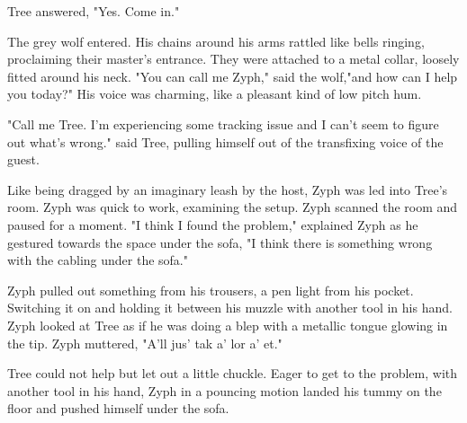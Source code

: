 Tree answered, "Yes. Come in."

The grey wolf entered. His chains around his arms rattled like bells ringing, proclaiming their master's entrance. They were attached to a metal collar, loosely fitted around his neck. "You can call me Zyph," said the wolf,"and how can I help you today?" His voice was charming, like a pleasant kind of low pitch hum.

"Call me Tree. I'm experiencing some tracking issue and I can't seem to figure out what's wrong." said Tree, pulling himself out of the transfixing voice of the guest.

Like being dragged by an imaginary leash by the host, Zyph was led into Tree's room. Zyph was quick to work, examining the setup. Zyph scanned the room and paused for a moment. "I think I found the \mbox{problem}," explained Zyph as he gestured towards the space under the sofa, "I think there is something wrong with the cabling under the sofa."

Zyph pulled out something from his trousers, a pen light from his pocket. Switching it on and holding it between his muzzle with another tool in his hand. Zyph looked at Tree as if he was doing a blep with a metallic tongue glowing in the tip. Zyph muttered, "A'll jus' tak a' lor a' et."

Tree could not help but let out a little chuckle. Eager to get to the problem, with another tool in his hand, Zyph in a pouncing motion landed his tummy on the floor and pushed himself under the sofa.
